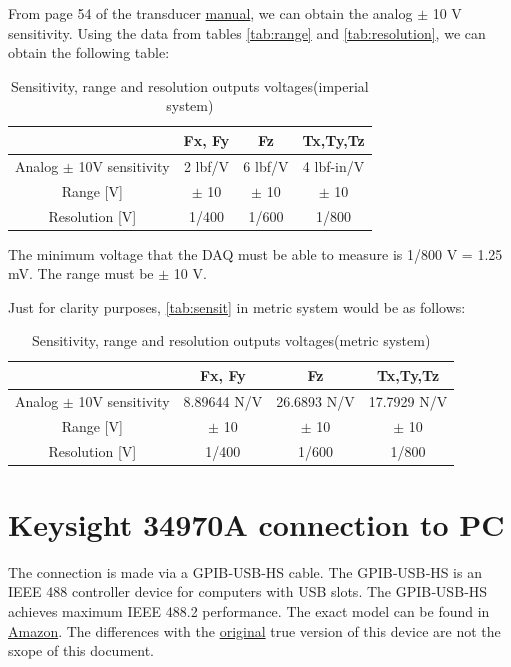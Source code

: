 \documentclass[a4paper]{article}
\begin{document}
From page 54 of the transducer \href{https://www.ati-ia.com/app_content/documents/9620-05-Transducer%20Section.pdf}{manual}, we can obtain the analog $\pm$ 10 V sensitivity. Using the data from tables \ref{tab:range} and \ref{tab:resolution}, we can obtain the following table:

\begin{table}[h!]
	\centering
	\caption{Sensitivity, range and resolution outputs voltages\label{tab:sensit} (imperial system)}
	\begin{tabular}{||c | c | c | c ||} 
		\hline
		 & Fx, Fy & Fz & Tx,Ty,Tz \\ [0.5ex] 
		\hline\hline
		Analog $\pm$ 10V sensitivity & 2 lbf/V & 6 lbf/V & 4 lbf-in/V\\ 
		\hline
		Range [V] & $\pm$ 10 & $\pm$ 10 & $\pm$ 10 \\
		\hline
		Resolution [V] & 1/400 & 1/600 & 1/800 \\
		\hline
	\end{tabular}
\end{table}

The minimum voltage that the DAQ must be able to measure is 1/800 V = 1.25 mV. The range must be $\pm$ 10 V.

Just for clarity purposes, \autoref{tab:sensit} in metric system would be as follows:

\begin{table}[h!]
	\centering
	\caption{Sensitivity, range and resolution outputs voltages\label{tab:sensit2} (metric system)}
	\begin{tabular}{||c | c | c | c ||} 
		\hline
		& Fx, Fy & Fz & Tx,Ty,Tz \\ [0.5ex] 
		\hline\hline
		Analog $\pm$ 10V sensitivity & 8.89644 N/V & 26.6893 N/V & 17.7929 N/V\\ 
		\hline
		Range [V] & $\pm$ 10 & $\pm$ 10 & $\pm$ 10 \\
		\hline
		Resolution [V] & 1/400 & 1/600 & 1/800 \\
		\hline
	\end{tabular}
\end{table}

\section{Keysight 34970A connection to PC}
The connection is made via a GPIB‑USB‑HS cable. The GPIB‑USB‑HS is an IEEE 488 controller device for computers with USB slots. The GPIB‑USB‑HS achieves maximum IEEE 488.2 performance. The exact model can be found in \hyperref{https://www.amazon.com/Kanonaki-GPIB-USB-HS-Interface-Adapter-Controller/dp/B07Q84XJJF}{category}{name}{Amazon}. The differences with the \hyperref{https://www.newark.com/ni/780570-01/gpib-usb-hs-gpib-control-device/dp/14AJ5119}{category}{name}{original} true version of this device are not the sxope of this document. 
\end{document}
